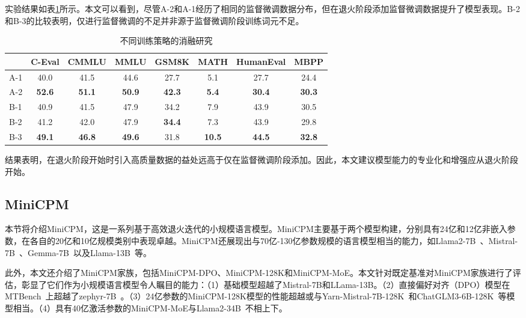 实验结果如表\ref{tab:dataexperiments}所示。本文可以看到，尽管A-2和A-1经历了相同的监督微调数据分布，但在退火阶段添加监督微调数据提升了模型表现。B-2和B-3的比较表明，仅进行监督微调的不足并非源于监督微调阶段训练词元不足。 

\begin{table}[h]
\centering
\begin{tabular}{lccccccc}
\toprule
            & \textbf{C-Eval} & \textbf{CMMLU} & \textbf{MMLU} & \textbf{GSM8K} & \textbf{MATH} & \textbf{HumanEval} & \textbf{MBPP} \\ \midrule
A-1 & 40.0  & 41.5  & 44.6 & 27.7  & 5.1  & 27.7      & 24.4 \\
A-2 & \textbf{52.6}  & \textbf{51.1} & \textbf{50.9} & \textbf{42.3 } & \textbf{5.4}  & \textbf{30.4 }     & \textbf{30.3} \\
\midrule

B-1 &   40.9  & 41.5 & 47.9 &  34.2 & 7.9   &  43.9 & 30.5 \\
B-2 &  41.2 &  42.0 &    47.9  & \textbf{34.4} & 7.3 &  43.9 & 29.8  \\ 
B-3 & \textbf{49.1}  & \textbf{46.8}  & \textbf{49.6} & 31.8  & \textbf{10.5}  & \textbf{44.5}  & \textbf{32.8}\\
\bottomrule
\end{tabular}
\caption{不同训练策略的消融研究
}
\label{tab:dataexperiments}
\end{table}

结果表明，在退火阶段开始时引入高质量数据的益处远高于仅在监督微调阶段添加。因此，本文建议模型能力的专业化和增强应从退火阶段开始。 

\subsection{MiniCPM}


本节将介绍MiniCPM，这是一系列基于高效退火迭代的小规模语言模型。MiniCPM主要基于两个模型构建，分别具有24亿和12亿非嵌入参数，在各自的20亿和10亿规模类别中表现卓越。MiniCPM还展现出与70亿-130亿参数规模的语言模型相当的能力，如Llama2-7B~\citep{touvron2023llama}、Mistral-7B~\citep{jiang2023mistral}、Gemma-7B~\citep{Banks2024Gemma}以及Llama-13B~\citep{touvron2023llama}等。

此外，本文还介绍了MiniCPM家族，包括MiniCPM-DPO、MiniCPM-128K和MiniCPM-MoE。本文针对既定基准对MiniCPM家族进行了评估，彰显了它们作为小规模语言模型令人瞩目的能力：（1）基础模型超越了Mistral-7B和LLama-13B。（2）直接偏好对齐（DPO）模型在MTBench~\citep{zheng2024judging}上超越了zephyr-7B~\citep{tunstall2023zephyr}。（3）24亿参数的MiniCPM-128K模型的性能超越或与Yarn-Mistral-7B-128K~\citep{peng2023yarn}和ChatGLM3-6B-128K~\citep{du2021glm}等模型相当。（4）具有40亿激活参数的MiniCPM-MoE与Llama2-34B~\citep{touvron2023llama}不相上下。

